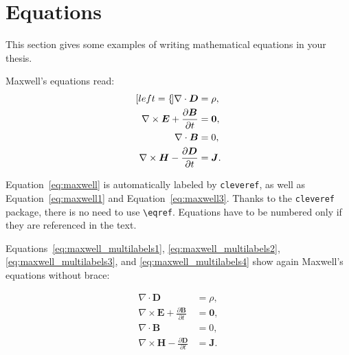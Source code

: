 \documentclass[11pt,a4paper]{article}
\begin{document}
    
    
\section{Equations}

    \label{sec:eqs}
    This section gives some examples of writing mathematical equations in your thesis.

    Maxwell's equations read:
    \begin{subequations}
        \label{eq:maxwell}
        \begin{align}[left=\empheqlbrace]
            \nabla\cdot \bm{D} & = \rho, \label{eq:maxwell1} \\
            \nabla \times \bm{E} +  \frac{\partial \bm{B}}{\partial t} & = \bm{0}, \label{eq:maxwell2} \\
            \nabla\cdot \bm{B} & = 0, \label{eq:maxwell3} \\
            \nabla \times \bm{H} - \frac{\partial \bm{D}}{\partial t} &= \bm{J}. \label{eq:maxwell4}
        \end{align}
    \end{subequations}

    Equation~\eqref{eq:maxwell} is automatically labeled by \texttt{cleveref}, as well as Equation~\eqref{eq:maxwell1} and Equation~\eqref{eq:maxwell3}. Thanks to the \verb|cleveref| package, there is no need to use \verb|\eqref|. Equations have to be numbered only if they are referenced in the text.

    Equations~\eqref{eq:maxwell_multilabels1}, \eqref{eq:maxwell_multilabels2}, \eqref{eq:maxwell_multilabels3}, and \eqref{eq:maxwell_multilabels4} show again Maxwell's equations without brace:

    \begin{align}
        \nabla\cdot \bm{D} & = \rho, \label{eq:maxwell_multilabels1} \\
        \nabla \times \bm{E} +  \frac{\partial \bm{B}}{\partial t} &= \bm{0}, \label{eq:maxwell_multilabels2} \\
        \nabla\cdot \bm{B} & = 0, \label{eq:maxwell_multilabels3} \\
        \nabla \times \bm{H} - \frac{\partial \bm{D}}{\partial t} &= \bm{J} \label{eq:maxwell_multilabels4}.
    \end{align}
\end{document}
